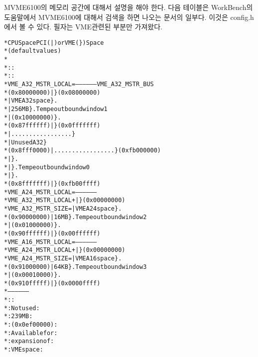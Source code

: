\documentclass[11pt,a4paper]{article}
\begin{document}
MVME6100의 메모리 공간에 대해서 설명을 해야 한다. 다음 테이블은 WorkBench의 도움말에서 
MVME6100에 대해서 검색을 하면 나오는 문서의 일부다. 이것은 config.h 에서 볼 수 있다.
필자는 VME관련된 부분만 가져왔다.

\begin{framed}
\begin{alltt}
 * CPU Space                                PCI (|) or VME (\}) Space
 * (default values)                       
 *
 *                              :                 :
 *                              :                 :
 * VME_A32_MSTR_LOCAL =          -----------------  VME_A32_MSTR_BUS
 *              (0x80000000)    |                 \} (0x08000000)  
 *                              | VME A32 space   \} .
 *                              |    256MB        \} . Tempe outbound window 1
 *                              | (0x10000000)    \} .
 *              (0x87ffffff)    |                 \} (0x0fffffff) 
 *                              |.................\}
 *                              | Unused A32      \}
 *              (0x8fff0000)    |.................\} (0xfb000000)
 *                              |                 \} .
 *                              |                 \} . Tempe outbound window 0
 *                              |                 \} .
 *              (0x8fffffff)    |                 \} (0xfb00ffff)
 * VME_A24_MSTR_LOCAL =          -----------------
 * VME_A32_MSTR_LOCAL +         |                 \} (0x00000000)
 * VME_A32_MSTR_SIZE =          | VME A24 space   \} .
 *              (0x90000000)    |    16MB         \} . Tempe outbound window 2
 *                              | (0x01000000)    \} .
 *              (0x90ffffff)    |                 \} (0x00ffffff)
 * VME_A16_MSTR_LOCAL =          -----------------
 * VME_A24_MSTR_LOCAL +         |                 \} (0x00000000)
 * VME_A24_MSTR_SIZE =          | VME A16 space   \} .
 *              (0x91000000)    |    64KB         \} . Tempe outbound window 3
 *                              | (0x00010000)    \} . 
 *              (0x910fffff)    |                 \} (0x0000ffff)
 *                               -----------------
 *                              :                 :
 *                              :  Not used       :
 *                              :  239 MB         :
 *                              : (0x0ef00000)    :
 *                              : Available for   :
 *                              : expansion of    :
 *                              : VME space       :
\end{alltt}
\end{framed}
\end{document}
